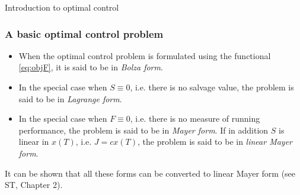 \documentclass[10pt]{beamer}
\theoremstyle{definition}
\begin{document}
\begin{section}{Introduction to optimal control}
\begin{frame}[fragile]
\frametitle{A basic optimal control problem}
\begin{itemize}\itemsep1em
\item When the optimal control problem is formulated using the functional \eqref{eq:objF}, it is said to be in \emph{Bolza form}.
\item In the special case when $ S\equiv 0 $, i.e. there is no salvage value, the problem is said to be in \emph{Lagrange form}.
\item In the special case when $ F\equiv 0 $, i.e. there is no measure of running performance, the problem is said to be in \emph{Mayer form}. If in addition $ S $ is linear in $ x(T) $, i.e. $ J=c x(T) $, the problem is said to be in \emph{linear Mayer form}.
\end{itemize}\bigskip\pause

\alert{It can be shown that all these forms can be converted to linear Mayer form (see ST, Chapter 2).}
\end{frame}
\end{section}
\end{document}
